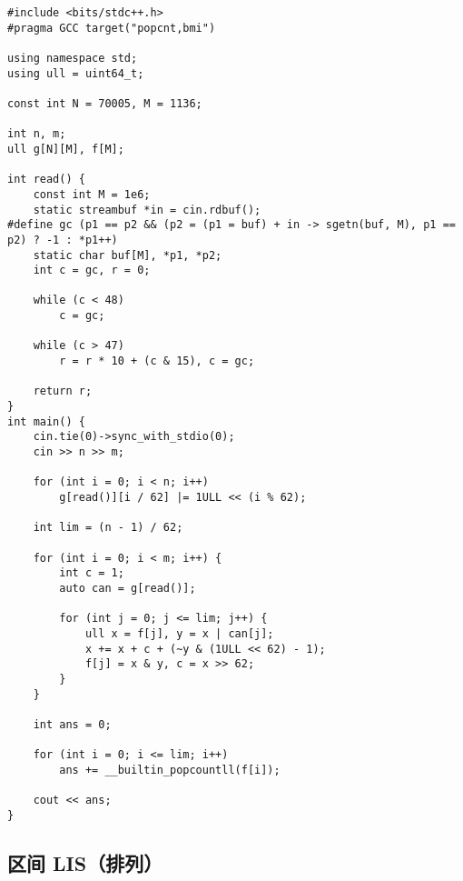 \documentclass[12pt]{ctexart}
\begin{document}
\begin{lstlisting}
#include <bits/stdc++.h>
#pragma GCC target("popcnt,bmi")

using namespace std;
using ull = uint64_t;

const int N = 70005, M = 1136;

int n, m;
ull g[N][M], f[M];

int read() {
    const int M = 1e6;
    static streambuf *in = cin.rdbuf();
#define gc (p1 == p2 && (p2 = (p1 = buf) + in -> sgetn(buf, M), p1 == p2) ? -1 : *p1++)
    static char buf[M], *p1, *p2;
    int c = gc, r = 0;

    while (c < 48)
        c = gc;

    while (c > 47)
        r = r * 10 + (c & 15), c = gc;

    return r;
}
int main() {
    cin.tie(0)->sync_with_stdio(0);
    cin >> n >> m;

    for (int i = 0; i < n; i++)
        g[read()][i / 62] |= 1ULL << (i % 62);

    int lim = (n - 1) / 62;

    for (int i = 0; i < m; i++) {
        int c = 1;
        auto can = g[read()];

        for (int j = 0; j <= lim; j++) {
            ull x = f[j], y = x | can[j];
            x += x + c + (~y & (1ULL << 62) - 1);
            f[j] = x & y, c = x >> 62;
        }
    }

    int ans = 0;

    for (int i = 0; i <= lim; i++)
        ans += __builtin_popcountll(f[i]);

    cout << ans;
}
\end{lstlisting}

\subsection{区间 LIS（排列）}
\end{document}
